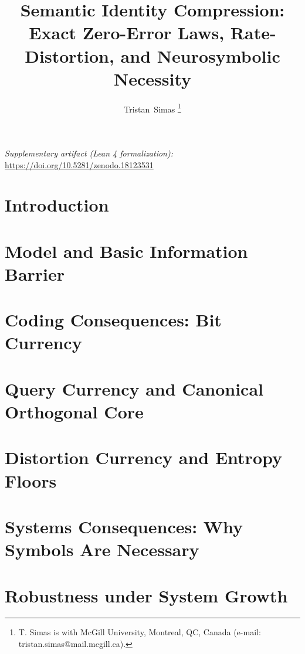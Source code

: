 \documentclass[12pt, onecolumn, draftclsnofoot]{IEEEtran}
\title{Semantic Identity Compression:\\ Exact Zero-Error Laws, Rate-Distortion, and Neurosymbolic Necessity}
\author{Tristan~Simas%
\thanks{T. Simas is with McGill University, Montreal, QC, Canada (e-mail: tristan.simas@mail.mcgill.ca).}}
\begin{document}
\ifdefined\JSAITREVIEW\doublespacing\fi

\maketitle


\ifdefined\JSAITREVIEW
\noindent\textit{Supplementary artifact (Lean 4 formalization):} \url{https://doi.org/10.5281/zenodo.18123531}
\par\medskip
\fi

\section{Introduction}


\section{Model and Basic Information Barrier}\label{sec:model}\label{sec:framework}


\section{Coding Consequences: Bit Currency}\label{sec:bits}



\section{Query Currency and Canonical Orthogonal Core}\label{sec:queries}


\section{Distortion Currency and Entropy Floors}\label{sec:distortion}


\section{Systems Consequences: Why Symbols Are Necessary}\label{sec:systems}\label{sec:applications}\label{sec:complexity}


\section{Robustness under System Growth}\label{sec:robustness}

\end{document}
